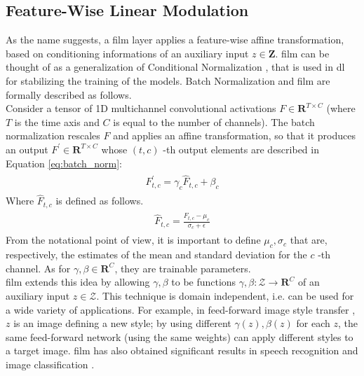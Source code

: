 \subsection{Feature-Wise Linear Modulation} \label{film}
As the name suggests, a \gls{film} layer applies a feature-wise affine transformation, based on conditioning informations of an auxiliary input $z \in \mathbf{Z}$. \gls{film} can be thought of as a generalization of Conditional Normalization \cite{dumoulin2016learned}, that is used in \gls{dl} for stabilizing the training of the models. Batch Normalization and \gls{film} are formally described as follows. \\
Consider a tensor of 1D multichannel convolutional activations $F \in \mathbf{R}^{T \times C}$ (where $T$ is the time axis and $C$ is equal to the number of channels). The batch normalization  rescales $F$ and applies an affine transformation, so that it produces an output $F^{\prime} \in \mathbf{R}^{T \times C}$ whose $(t, c)$ -th output elements are described in Equation \ref{eq:batch_norm}:
\begin{align}\label{eq:batch_norm}
	\begin{array}{c}
		F_{t, c}^{\prime}=\gamma_{c} \hat{F}_{t, c}+\beta_{c}
	\end{array}
\end{align}
Where $\hat{F}_{t, c}$ is defined as follows.
\begin{align}\label{eq:batch_norm2}
	\begin{array}{c}
		\hat{F}_{t, c}=\frac{F_{t, c}-\mu_{c}}{\sigma_{c}+\epsilon} 
	\end{array}
\end{align}
From the notational point of view, it is important to define $\mu_{c}, \sigma_{c}$ that are, respectively, the estimates of the mean and standard deviation for the $c$ -th channel. As for $\gamma, \beta \in \mathbf{R}^{C}$, they are trainable parameters. \\
\gls{film} \cite{perez2018film} extends this idea by allowing $\gamma, \beta$ to be functions $\gamma, \beta: \mathcal{Z} \rightarrow \mathbf{R}^{C}$ of an auxiliary input $z \in \mathcal{Z}$. This technique is domain independent, i.e. can be used for a wide variety of applications. For example, in feed-forward image style transfer \cite{dumoulin2016learned}, $z$ is an image defining a new style; by using different $\gamma(z), \beta(z)$ for each $z$, the same feed-forward network (using the same weights) can apply different styles to a target image. \gls{film} has also obtained significant results in speech recognition \cite{kim2017dynamic} and image classification \cite{hu2018squeeze}. 


